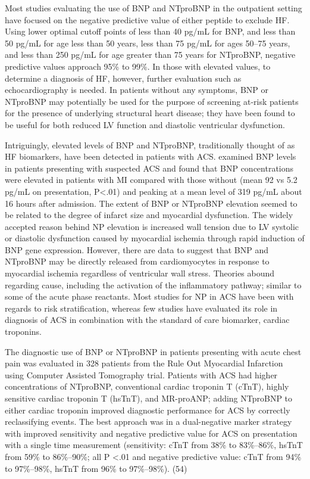 \documentclass[14pt,a4paper,onecolumn]{extarticle}
\begin{document}
Most studies evaluating the use of BNP and NTproBNP in the outpatient setting have focused on the negative predictive value of either peptide to exclude HF. Using lower optimal cutoff points of less than 40 pg/mL for BNP, and less than 50 pg/mL for age less than 50 years, less than 75 pg/mL for ages 50–75 years, and less than 250 pg/mL for age greater than 75 years for NTproBNP, negative predictive values approach 95\% to 99\%. In those with elevated values, to determine a diagnosis of HF, however, further evaluation such as echocardiography is needed. In patients without any symptoms, BNP or NTproBNP may potentially be used for the purpose of screening at-risk patients for the presence of underlying structural heart disease; they have been found to be useful for both reduced LV function and diastolic ventricular dysfunction. \citep{Gaggin2014}

Intriguingly, elevated levels of BNP and NTproBNP, traditionally thought of as HF biomarkers, have been detected in patients with ACS. \citep{bib3135} examined BNP levels in patients presenting with suspected ACS and found that BNP concentrations were elevated in patients with MI compared with those without (mean 92 vs 5.2 pg/mL on presentation, P<.01) and peaking at a mean level of 319 pg/mL about 16 hours after admission. The extent of BNP or NTproBNP elevation seemed to be related to the degree of infarct size and myocardial dysfunction. The widely accepted reason behind NP elevation is increased wall tension due to LV systolic or diastolic dysfunction caused by myocardial ischemia through rapid induction of BNP gene expression. However, there are data to suggest that BNP and NTproBNP may be directly released from cardiomyocytes in response to myocardial ischemia regardless of ventricular wall stress. Theories abound regarding cause, including the activation of the inflammatory pathway; similar to some of the acute phase reactants.  Most studies for NP in ACS have been with regards to risk stratification, whereas few studies have evaluated its role in diagnosis of ACS in combination with the standard of care biomarker, cardiac troponins. \citep{Gaggin2014}

The diagnostic use of BNP or NTproBNP in patients presenting with acute chest pain was evaluated in 328 patients from the Rule Out Myocardial Infarction using Computer Assisted Tomography trial. Patients with ACS had higher concentrations of NTproBNP, conventional cardiac troponin T (cTnT), highly sensitive cardiac troponin T (hsTnT), and MR-proANP; adding NTproBNP to either cardiac troponin improved diagnostic performance for ACS by correctly reclassifying events. The best approach was in a dual-negative marker strategy with improved sensitivity and negative predictive value for ACS on presentation with a single time measurement (sensitivity: cTnT from 38\% to 83\%–86\%, hsTnT from 59\% to 86\%–90\%; all P <.01 and negative predictive value: cTnT from 94\% to 97\%–98\%, hsTnT from 96\% to 97\%–98\%). (54)
\end{document}
